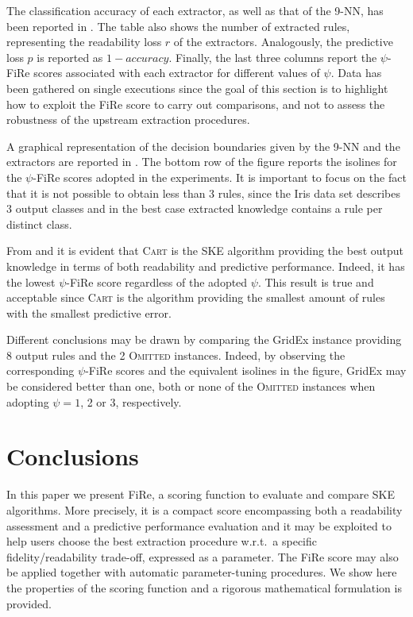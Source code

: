 \documentclass{article}
\newcommand{\gridex}{GridEx}
\newcommand{\creepy}{\textsc{Omitted}} %
\newcommand{\cart}{\textsc{Cart}}
\newcommand{\fire}{FiRe}
\newcommand{\psifire}{$\psi$-\fire}
\begin{document}
The classification accuracy of each extractor, as well as that of the 9-NN, has been reported in .
%
The table also shows the number of extracted rules, representing the readability loss $r$ of the extractors.
%
Analogously, the predictive loss $p$ is reported as $1-accuracy$.
%
Finally, the last three columns report the \psifire{} scores associated with each extractor for different values of $\psi$.
%
Data has been gathered on single executions since the goal of this section is to highlight how to exploit the \fire{} score to carry out comparisons, and not to assess the robustness of the upstream extraction procedures.

A graphical representation of the decision boundaries given by the 9-NN and the extractors are reported in .
%
The bottom row of the figure reports the isolines for the \psifire{} scores adopted in the experiments.
%
It is important to focus on the fact that it is not possible to obtain less than 3 rules, since the Iris data set describes 3 output classes and in the best case extracted knowledge contains a rule per distinct class.

From  and  it is evident that \cart{} is the SKE algorithm providing the best output knowledge in terms of both readability and predictive performance.
%
Indeed, it has the lowest \psifire{} score regardless of the adopted $\psi$.
%
This result is true and acceptable since \cart{} is the algorithm providing the smallest amount of rules with the smallest predictive error.

Different conclusions may be drawn by comparing the \gridex{} instance providing 8 output rules and the 2 \creepy{} instances.
%
Indeed, by observing the corresponding \psifire{} scores and the equivalent isolines in the figure, \gridex{} may be considered better than one, both or none of the \creepy{} instances when adopting $\psi=1$, 2 or 3, respectively.

\section{Conclusions}\label{sec:conclusions}

In this paper we present \fire{}, a scoring function to evaluate and compare SKE algorithms.
%
More precisely, it is a compact score encompassing both a readability assessment and a predictive performance evaluation and it may be exploited to help users choose the best extraction procedure w.r.t.\ a specific fidelity/readability trade-off, expressed as a parameter.
%
The \fire{} score may also be applied together with automatic parameter-tuning procedures.
%
We show here the properties of the scoring function and a rigorous mathematical formulation is provided.
\end{document}
